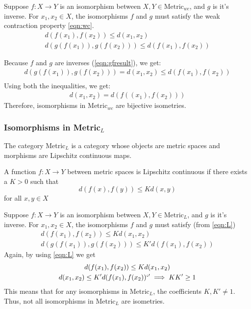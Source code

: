 \begin{frame}
    Suppose \(f:X\rightarrow Y\) is an isomorphism between \(X,Y\in \text{Metric}_{wc}\), and \(g\) is it's inverse. 
    For \(x_1,x_2\in X\), the isomorphisms \(f\) and \(g\) must satisfy the weak contraction property \autoref{eqn:wc}.
    \begin{gather*}
        d(f(x_1),f(x_2))\leq d(x_1,x_2)\\
        d(g(f(x_1)),g(f(x_2)))\leq d(f(x_1),f(x_2))
    \end{gather*}

    Because \(f\) and \(g\) are inverses (\autoref{eqn:gfresult}), we get: 
    \begin{gather*}
        d(g(f(x_1)),g(f(x_2)))=d(x_1, x_2)\leq d(f(x_1),f(x_2))\\
    \end{gather*}
    Using both the inequalities, we get:
    \begin{gather*}
         d(x_1,x_2)=d(f((x_1),f(x_2)))
    \end{gather*}
    \pause
    Therefore, isomorphisms in Metric\(_{wc}\) are bijective isometries.

\end{frame}

\begin{frame}
    \frametitle{Isomorphisms in Metric\(_{L}\)}
    The category Metric\(_{L}\) is a category whose objects are metric spaces and morphisms are Lipschitz continuous maps.
    \pause
    \begin{definition}
        A function \(f : X \rightarrow Y\) between metric spaces is
        Lipschitz continuous if there exists a \(K > 0\) such that
        \begin{equation}
            d(f(x),f(y))\leq Kd(x,y)
            \label{eqn:L}
        \end{equation}
        for all \(x,y\in X\)
    \end{definition}    

\end{frame}

\begin{frame}
    Suppose \(f:X\rightarrow Y\) is an isomorphism between \(X,Y\in \text{Metric}_{L}\), and \(g\) is it's inverse. 
    For \(x_1,x_2\in X\), the isomorphisms \(f\) and \(g\) must satisfy (from \autoref{eqn:L})
    \begin{gather*}
        d(f(x_1),f(x_2))\leq Kd(x_1,x_2)\\
        d(g(f(x_1)),g(f(x_2)))\leq K'd(f(x_1),f(x_2))
    \end{gather*}
    Again, by using \autoref{eqn:L} we get
    \begin{gather*}
        d(f(x_1),f(x_2))\leq Kd(x_1,x_2)\\
        d(x_1,x_2)\leq K'd(f(x_1),f(x_2))`'
        \implies KK' \geq 1
    \end{gather*}
    \pause
    This means that for any isomorphisms in Metric\(_{L}\), the coefficients \(K,K'\neq 1\). 
    Thus, not all isomorphisms in Metric\(_L\) are isometries.

\end{frame}

